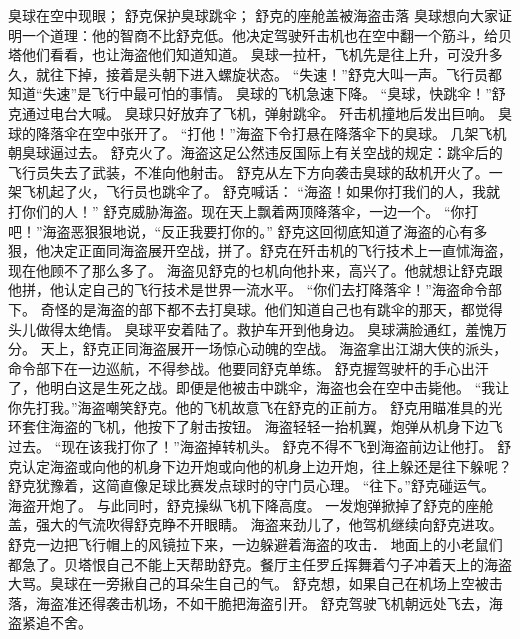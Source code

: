 \documentclass[a4paper,12pt,UTF8,twoside]{ctexbook}
\begin{document}
        臭球在空中现眼； 
        舒克保护臭球跳伞； 
        舒克的座舱盖被海盗击落   
        臭球想向大家证明一个道理：他的智商不比舒克低。他决定驾驶歼击机也在空中翻一个筋斗，给贝塔他们看看，也让海盗他们知道知道。 
        臭球一拉杆，飞机先是往上升，可没升多久，就往下掉，接着是头朝下进入螺旋状态。 
        “失速！”舒克大叫一声。飞行员都知道“失速”是飞行中最可怕的事情。 
        臭球的飞机急速下降。 
        “臭球，快跳伞！”舒克通过电台大喊。 
        臭球只好放弃了飞机，弹射跳伞。 
        歼击机撞地后发出巨响。 
        臭球的降落伞在空中张开了。 
        “打他！”海盗下令打悬在降落伞下的臭球。 
        几架飞机朝臭球逼过去。 
        舒克火了。海盗这足公然违反国际上有关空战的规定：跳伞后的飞行员失去了武装，不准向他射击。 
        舒克从左下方向袭击臭球的敌机开火了。一架飞机起了火，飞行员也跳伞了。 
        舒克喊话： 
        “海盗！如果你打我们的人，我就打你们的人！” 
        舒克威胁海盗。现在天上飘着两顶降落伞，一边一个。 
        “你打吧！”海盗恶狠狠地说，“反正我要打你的。” 
        舒克这回彻底知道了海盗的心有多狠，他决定正面同海盗展开空战，拼了。舒克在歼击机的飞行技术上一直怵海盗，现在他顾不了那么多了。 
        海盗见舒克的乜机向他扑来，高兴了。他就想让舒克跟他拼，他认定自己的飞行技术是世界一流水平。 
        “你们去打降落伞！”海盗命令部下。 
        奇怪的是海盗的部下都不去打臭球。他们知道自己也有跳伞的那天，都觉得头儿做得太绝情。 
        臭球平安着陆了。救护车开到他身边。 
        臭球满脸通红，羞愧万分。 
        天上，舒克正同海盗展开一场惊心动魄的空战。 
        海盗拿出江湖大侠的派头，命令部下在一边巡航，不得参战。他要同舒克单练。 
        舒克握驾驶杆的手心出汗了，他明白这是生死之战。即便是他被击中跳伞，海盗也会在空中击毙他。 
        “我让你先打我。”海盗嘲笑舒克。他的飞机故意飞在舒克的正前方。 
        舒克用瞄准具的光环套住海盗的飞机，他按下了射击按钮。 
        海盗轻轻一抬机翼，炮弹从机身下边飞过去。 
        “现在该我打你了！”海盗掉转机头。 
        舒克不得不飞到海盗前边让他打。 
        舒克认定海盗或向他的机身下边开炮或向他的机身上边开炮，往上躲还是往下躲呢？舒克犹豫着，这简直像足球比赛发点球时的守门员心理。 
        “往下。”舒克碰运气。 
        海盗开炮了。 
        与此同时，舒克操纵飞机下降高度。 
        一发炮弹掀掉了舒克的座舱盖，强大的气流吹得舒克睁不开眼睛。 
        海盗来劲儿了，他驾机继续向舒克进攻。 
        舒克一边把飞行帽上的风镜拉下来，一边躲避着海盗的攻击． 
        地面上的小老鼠们都急了。贝塔恨自己不能上天帮助舒克。餐厅主任罗丘挥舞着勺子冲着天上的海盗大骂。臭球在一旁揪自己的耳朵生自己的气。 
        舒克想，如果自己在机场上空被击落，海盗准还得袭击机场，不如干脆把海盗引开。 
        舒克驾驶飞机朝远处飞去，海盗紧追不舍。 
\end{document}
